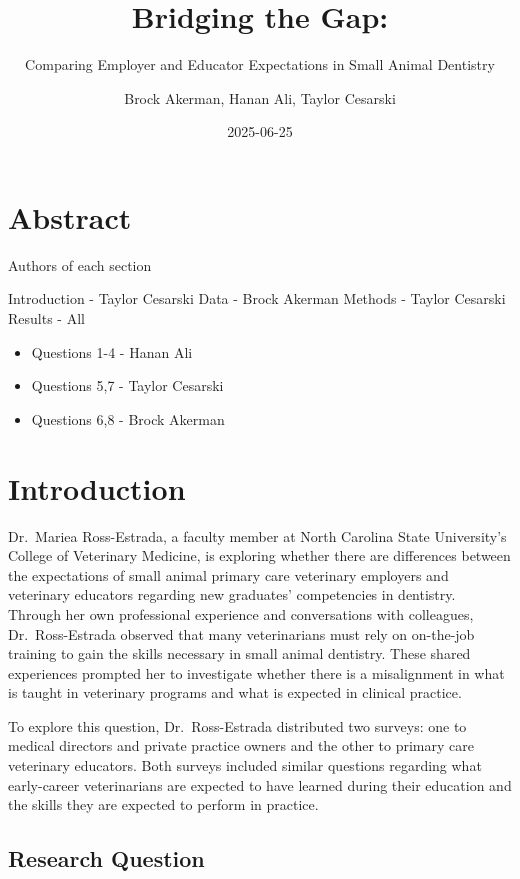 \documentclass[
  11pt,
  letterpaper,
  DIV=11,
  numbers=noendperiod]{scrartcl}
\title{Bridging the Gap:}
\subtitle{Comparing Employer and Educator Expectations in Small Animal
Dentistry}
\author{Brock Akerman, Hanan Ali, Taylor Cesarski}
\date{2025-06-25}
\providecommand{\tightlist}{%
  \setlength{\itemsep}{0pt}\setlength{\parskip}{0pt}}\usepackage{longtable,booktabs,array}
\numberwithin{figure}{section}
\renewcommand*\contentsname{Table of contents}
\newcommand\contentsname{Table of contents}
\begin{document}
\maketitle

\renewcommand*\contentsname{Table of contents}
{
\hypersetup{linkcolor=}
\setcounter{tocdepth}{2}
\tableofcontents
}

\section{Abstract}\label{abstract}

Authors of each section

Introduction - Taylor Cesarski Data - Brock Akerman Methods - Taylor
Cesarski Results - All

\begin{itemize}
\tightlist
\item
  Questions 1-4 - Hanan Ali
\item
  Questions 5,7 - Taylor Cesarski
\item
  Questions 6,8 - Brock Akerman
\end{itemize}

\section{Introduction}\label{introduction}

Dr.~Mariea Ross-Estrada, a faculty member at North Carolina State
University's College of Veterinary Medicine, is exploring whether there
are differences between the expectations of small animal primary care
veterinary employers and veterinary educators regarding new graduates'
competencies in dentistry. Through her own professional experience and
conversations with colleagues, Dr.~Ross-Estrada observed that many
veterinarians must rely on on-the-job training to gain the skills
necessary in small animal dentistry. These shared experiences prompted
her to investigate whether there is a misalignment in what is taught in
veterinary programs and what is expected in clinical practice.

To explore this question, Dr.~Ross-Estrada distributed two surveys: one
to medical directors and private practice owners and the other to
primary care veterinary educators. Both surveys included similar
questions regarding what early-career veterinarians are expected to have
learned during their education and the skills they are expected to
perform in practice.

\subsection{Research Question}\label{research-question}
\end{document}
